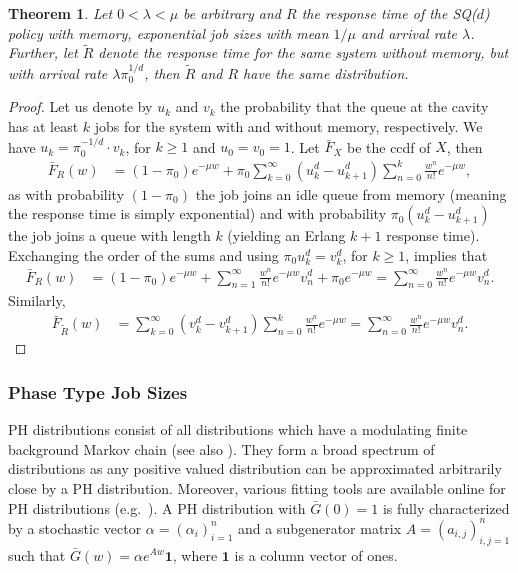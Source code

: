 \documentclass[12pt]{report}
\newtheorem{theorem}{Theorem}
\begin{document}
\begin{theorem} \label{thm:response_SQd}
Let $0< \lambda < \mu$ be arbitrary and $R$ the response time of the SQ($d$) policy with 
memory, exponential job sizes with mean $1/\mu$ and arrival rate $\lambda$. Further, let $\tilde R$ denote the response time for the same system without memory, but with arrival rate $\lambda \pi_0^{1/d}$, then $\tilde R$ and $R$ have the same distribution.
\end{theorem}
\begin{proof}
Let us denote by $u_k$  and $v_k$ the probability that the queue at the cavity has at least $k$ jobs for the system with and without memory, respectively. 
We have $u_k=\pi_0^{-1/d} \cdot v_k$, for $k \geq 1$ and $u_0 = v_0 = 1$. Let $\bar F_X$ be the ccdf of $X$, then
\begin{align*}
\bar F_{R}(w)
&=(1-\pi_0) e^{-\mu w} + \pi_0 \sum_{k=0}^\infty (u_k^d-u_{k+1}^d) \sum_{n=0}^k \frac{w^n}{n!} e^{-\mu w},
\end{align*}
as with probability $(1-\pi_0)$ the job joins an idle queue from memory (meaning the response time is
simply exponential) and with
probability $\pi_0 (u_k^d-u_{k+1}^d)$ the job joins a queue with length $k$
(yielding an Erlang $k+1$ response time). Exchanging the order of the sums 
and using $\pi_0 u_k^d= v_k^d$, for $k \geq 1$, implies that
\begin{align*}
\bar F_{R}(w)
&=(1-\pi_0) e^{-\mu w} + \sum_{n=1}^\infty \frac{w^n}{n!} e^{-\mu w} v_n^d + \pi_0 e^{-\mu w} =\sum_{n=0}^\infty \frac{w^n}{n!} e^{-\mu w} v_n^d.
\end{align*}
Similarly,
\begin{align*}
\bar F_{\tilde R}(w)
&=\sum_{k=0}^\infty (v_k^d-v_{k+1}^d) \sum_{n=0}^k \frac{w^n}{n!} e^{-\mu w} =\sum_{n=0}^\infty \frac{w^n}{n!} e^{-\mu w} v_n^d.
\end{align*}
\end{proof}

\subsubsection{Phase Type Job Sizes}\label{sec:SQd_PH}
PH distributions consist of all distributions which have a modulating finite background Markov chain (see also \cite{latouche1999introduction}). They form a broad spectrum of distributions as any positive valued distribution can be approximated arbitrarily close by a PH distribution. Moreover, various fitting tools are available online for PH distributions (e.g.~\cite{kriege2014ph,panchenko1}). A PH distribution with $\bar G(0) =1$ is fully characterized by a stochastic vector $\alpha=(\alpha_i)_{i=1}^n$ and a subgenerator matrix $A=(a_{i,j})_{i,j=1}^n$ such that $\bar G(w)=\alpha e^{Aw} \textbf{1}$, where $\textbf{1}$ is a column vector of ones.
\end{document}
